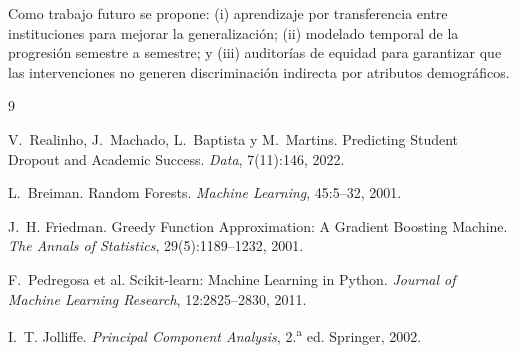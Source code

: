\documentclass{article}
\begin{document}
Como trabajo futuro se propone: (i) aprendizaje por transferencia entre instituciones para mejorar la generalizaci\'on; (ii) modelado temporal de la progresi\'on semestre a semestre; y (iii) auditor\'ias de equidad para garantizar que las intervenciones no generen discriminaci\'on indirecta por atributos demogr\'aficos.

\begin{thebibliography}{9}

V.~Realinho, J.~Machado, L.~Baptista y M.~Martins.
\newblock Predicting Student Dropout and Academic Success.
\newblock \emph{Data}, 7(11):146, 2022.

L.~Breiman.
\newblock Random Forests.
\newblock \emph{Machine Learning}, 45:5--32, 2001.

J.~H. Friedman.
\newblock Greedy Function Approximation: A Gradient Boosting Machine.
\newblock \emph{The Annals of Statistics}, 29(5):1189--1232, 2001.

F.~Pedregosa et al.
\newblock Scikit-learn: Machine Learning in Python.
\newblock \emph{Journal of Machine Learning Research}, 12:2825--2830, 2011.

I.~T. Jolliffe.
\newblock \emph{Principal Component Analysis}, 2.\textsuperscript{a} ed.
\newblock Springer, 2002.

\end{thebibliography}
\end{document}

